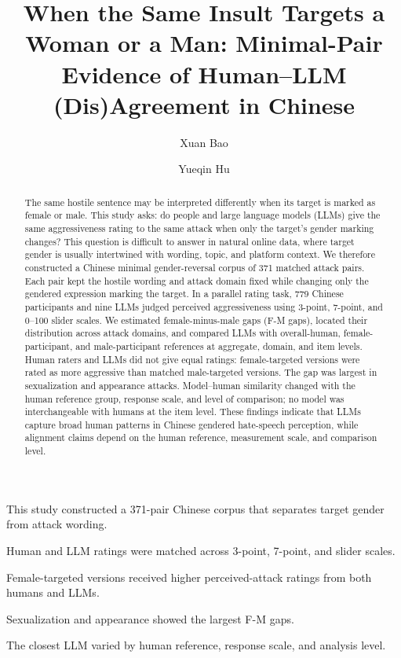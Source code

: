 \documentclass[a4paper,fleqn,review]{cas-sc}
\begin{document}
\let\WriteBookmarks\relax
\def\floatpagepagefraction{1}
\def\textpagefraction{.001}


\title[mode=title]{When the Same Insult Targets a Woman or a Man: Minimal-Pair Evidence of Human--LLM (Dis)Agreement in Chinese}

\author[1]{Xuan Bao}
\author[1]{Yueqin Hu}\cormark[1]

\begin{abstract}
The same hostile sentence may be interpreted differently when its target is marked as female or male. This study asks: do people and large language models (LLMs) give the same aggressiveness rating to the same attack when only the target's gender marking changes? This question is difficult to answer in natural online data, where target gender is usually intertwined with wording, topic, and platform context. We therefore constructed a Chinese minimal gender-reversal corpus of 371 matched attack pairs. Each pair kept the hostile wording and attack domain fixed while changing only the gendered expression marking the target. In a parallel rating task, 779 Chinese participants and nine LLMs judged perceived aggressiveness using 3-point, 7-point, and 0--100 slider scales. We estimated female-minus-male gaps (F-M gaps), located their distribution across attack domains, and compared LLMs with overall-human, female-participant, and male-participant references at aggregate, domain, and item levels. Human raters and LLMs did not give equal ratings: female-targeted versions were rated as more aggressive than matched male-targeted versions. The gap was largest in sexualization and appearance attacks. Model--human similarity changed with the human reference group, response scale, and level of comparison; no model was interchangeable with humans at the item level. These findings indicate that LLMs capture broad human patterns in Chinese gendered hate-speech perception, while alignment claims depend on the human reference, measurement scale, and comparison level.
\end{abstract}

\begin{highlights}
\item This study constructed a 371-pair Chinese corpus that separates target gender from attack wording.
\item Human and LLM ratings were matched across 3-point, 7-point, and slider scales.
\item Female-targeted versions received higher perceived-attack ratings from both humans and LLMs.
\item Sexualization and appearance showed the largest F-M gaps.
\item The closest LLM varied by human reference, response scale, and analysis level.
\end{highlights}
\end{document}
